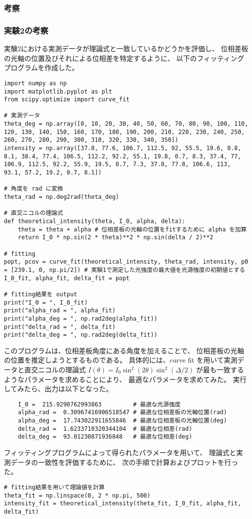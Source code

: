 \documentclass{article}
\begin{document}
\subsubsection{考察}
\subsubsection*{実験2の考察}
\begin{spacing}{1.2}
    実験2における実測データが理論式と一致しているかどうかを評価し、
    位相差板の光軸の位置及びそれによる位相差を特定するように、
    以下のフィッティングプログラムを作成した。
\begin{lstlisting}
import numpy as np
import matplotlib.pyplot as plt
from scipy.optimize import curve_fit

# 実測データ
theta_deg = np.array([0, 10, 20, 30, 40, 50, 60, 70, 80, 90, 100, 110, 120, 130, 140, 150, 160, 170, 180, 190, 200, 210, 220, 230, 240, 250, 260, 270, 280, 290, 300, 310, 320, 330, 340, 350])
intensity = np.array([37.8, 77.6, 106.7, 112.5, 92, 55.5, 19.6, 0.8, 8.1, 38.4, 77.4, 106.5, 112.2, 92.2, 55.1, 19.8, 0.7, 8.3, 37.4, 77, 106.9, 112.5, 92.2, 55.9, 19.5, 0.7, 7.3, 37.8, 77.8, 106.6, 113, 93.1, 57.2, 19.2, 0.7, 8.1])

# 角度を rad に変換 
theta_rad = np.deg2rad(theta_deg)

# 直交ニコルの理論式
def theoretical_intensity(theta, I_0, alpha, delta): 
    theta = theta + alpha # 位相差板の光軸の位置をfitするために alpha を加算
    return I_0 * np.sin(2 * theta)**2 * np.sin(delta / 2)**2

# fitting
popt, pcov = curve_fit(theoretical_intensity, theta_rad, intensity, p0 = [239.1, 0, np.pi/2]) # 実験1で測定した光強度の最大値を光源強度の初期値とする
I_0_fit, alpha_fit, delta_fit = popt

# fitting結果を output
print("I_0 = ", I_0_fit)
print("alpha_rad = ", alpha_fit)
print("alpha_deg = ", np.rad2deg(alpha_fit))
print("delta_rad = ", delta_fit)
print("delta_deg = ", np.rad2deg(delta_fit))
\end{lstlisting}
    このプログラムは、位相差板角度にある角度を加えることで、
    位相差板の光軸の位置を推定しようとするものである。
    具体的には、curve fit を用いて実測データと直交ニコルの理論式
    $I(\theta) = I_0 \sin^2(2\theta) \sin^2\left(\Delta / 2\right)$
    が最も一致するようなパラメータを求めることにより、
    最適なパラメータを求めてみた。
    実行してみたら、出力は以下となった。
\begin{lstlisting}
    I_0 =  215.9290762993863         # 最適な光源強度
    alpha_rad =  0.30967416906518547 # 最適な位相差板の光軸位置(rad)
    alpha_deg =  17.743022911655846  # 最適な位相差板の光軸位置(deg)
    delta_rad =  1.6233710320344104  # 最適な位相差(rad)
    delta_deg =  93.01230871936848   # 最適な位相差(deg)
\end{lstlisting}
フィッティングプログラムによって得られたパラメータを用いて、
理論式と実測データの一致性を評価するために、
次の手順で計算およびプロットを行った。
\begin{lstlisting}
# fitting結果を用いて理論値を計算
theta_fit = np.linspace(0, 2 * np.pi, 500)
intensity_fit = theoretical_intensity(theta_fit, I_0_fit, alpha_fit, delta_fit)
    

\end{lstlisting}
\end{spacing}
\end{document}
